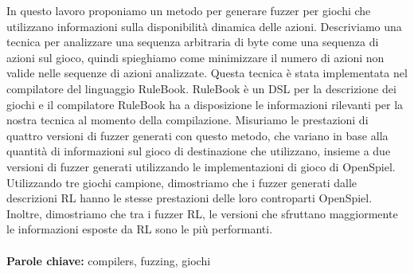 \documentclass{Configuration_Files/PoliMi3i_thesis}
\begin{document}
In questo lavoro proponiamo un metodo per generare fuzzer per giochi che utilizzano informazioni sulla disponibilità dinamica delle azioni.
Descriviamo una tecnica per analizzare una sequenza arbitraria di byte come una sequenza di azioni sul gioco, quindi spieghiamo come minimizzare il numero di azioni non valide nelle sequenze di azioni analizzate.
Questa tecnica è stata implementata nel compilatore del linguaggio RuleBook. RuleBook è un DSL per la descrizione dei giochi e il compilatore RuleBook ha a disposizione le informazioni rilevanti per la nostra tecnica al momento della compilazione.
Misuriamo le prestazioni di quattro versioni di fuzzer generati con questo metodo, che variano in base alla quantità di informazioni sul gioco di destinazione che utilizzano, insieme a due versioni di fuzzer generati utilizzando le implementazioni di gioco di OpenSpiel.
Utilizzando tre giochi campione, dimostriamo che i fuzzer generati dalle descrizioni RL hanno le stesse prestazioni delle loro controparti OpenSpiel.
Inoltre, dimostriamo che tra i fuzzer RL, le versioni che sfruttano maggiormente le informazioni esposte da RL sono le più performanti.
\\
\\
\textbf{Parole chiave:} compilers, fuzzing, giochi

\thispagestyle{empty}
\tableofcontents %
\thispagestyle{empty}
\cleardoublepage

%
%
%    
%
\end{document}
